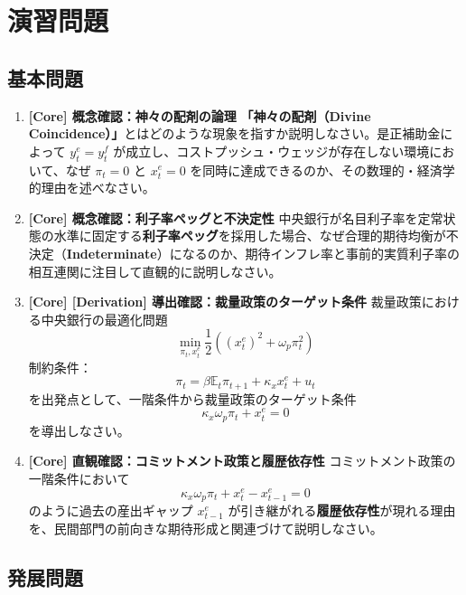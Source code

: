 \documentclass[
  japanese,
  lualatex,
  ja=standard,
  12pt,
  a4paper]{ltjsarticle}
\begin{document}
\Needspace{0.28\textheight}

\section{演習問題}\label{ux6f14ux7fd2ux554fux984c}

\subsection{基本問題}\label{ux57faux672cux554fux984c}

\begin{enumerate}
\def\labelenumi{\arabic{enumi}.}
\item
  \textbf{{[}Core{]} 概念確認：神々の配剤の論理}
  \textbf{「神々の配剤（Divine
  Coincidence）」}とはどのような現象を指すか説明しなさい。是正補助金によって
  \(y_t^e=y_t^f\)
  が成立し、コストプッシュ・ウェッジが存在しない環境において、なぜ
  \(\pi_t=0\) と \(x_t^e=0\)
  を同時に達成できるのか、その数理的・経済学的理由を述べなさい。
\item
  \textbf{{[}Core{]} 概念確認：利子率ペッグと不決定性}
  中央銀行が名目利子率を定常状態の水準に固定する\textbf{利子率ペッグ}を採用した場合、なぜ合理的期待均衡が不決定（\textbf{Indeterminate}）になるのか、期待インフレ率と事前的実質利子率の相互連関に注目して直観的に説明しなさい。
\item
  \textbf{{[}Core{]} {[}Derivation{]}
  導出確認：裁量政策のターゲット条件}
  裁量政策における中央銀行の最適化問題 \[
  \min_{\pi_t,x_t^e}\frac{1}{2}\left(\left(x_t^e\right)^2+\omega_p\pi_t^2\right)
  \] 制約条件： \[
  \pi_t=\beta\mathbb{E}_t\pi_{t+1}+\kappa_x x_t^e+u_t
  \] を出発点として、一階条件から裁量政策のターゲット条件 \[
  \kappa_x\omega_p\pi_t+x_t^e=0
  \] を導出しなさい。
\item
  \textbf{{[}Core{]} 直観確認：コミットメント政策と履歴依存性}
  コミットメント政策の一階条件において \[
  \kappa_x\omega_p\pi_t+x_t^e-x_{t-1}^e=0
  \] のように過去の産出ギャップ \(x_{t-1}^e\)
  が引き継がれる\textbf{履歴依存性}が現れる理由を、民間部門の前向きな期待形成と関連づけて説明しなさい。
\end{enumerate}

\Needspace{0.22\textheight}

\subsection{発展問題}\label{ux767aux5c55ux554fux984c}
\end{document}
